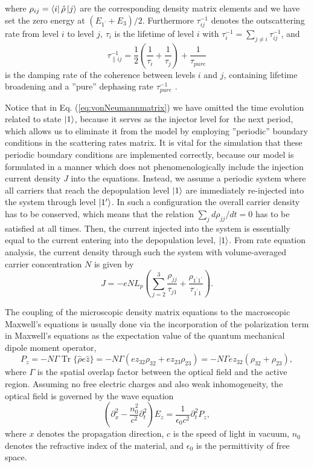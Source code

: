 \documentclass[10pt,letterpaper]{article}%
\DeclareMathOperator{\Tr}{Tr}
\begin{document}
where $\rho_{ij}=\Bra{i}\hat{\rho}\Ket{j}$ are the corresponding density
matrix elements and we have set the zero energy at $(E_{1^{\prime}}+E_{3})/2$.
Furthermore $\tau_{ij}^{-1}$ denotes the outscattering rate from level $i$ to
level $j$, $\tau_{i}$ is the lifetime of level $i$ with $\tau_{i}^{-1}%
=\sum_{j\neq i}\tau_{ij}^{-1}$, and
\[
\tau_{\parallel ij}^{-1}=\frac{1}{2}\left(  \frac{1}{\tau_{i}}+\frac{1}%
{\tau_{j}}\right)  +\frac{1}{\tau_{pure}}%
\]
is the damping rate of the coherence between levels $i$ and $j$, containing
lifetime broadening and a ''pure'' dephasing rate $\tau_{pure}^{-1}$
\cite{callebaut2005importance}.

Notice that in Eq. (\ref{eq:vonNeumannmatrix}) we have omitted the time
evolution related to state $\Ket{1}$, because it serves as the injector level
for\ the next period, which allows us to eliminate it from the model by
employing ''periodic'' boundary conditions in the scattering rates matrix. It
is vital for the simulation that these periodic boundary conditions are
implemented correctly, because our model is formulated in a manner which does
not phenomenologically include the injection current density $J$ into the
equations. Instead, we assume a periodic system where all carriers that reach
the depopulation level $\Ket{1}$ are immediately re-injected into the system
through level $\Ket{1'}$. In such a configuration the overall carrier density
has to be conserved, which means that the relation $\sum_{j}d\rho_{jj}/dt=0$
has to be satisfied at all times. Then, the current injected into the system
is essentially equal to the current entering into the depopulation level,
$\Ket{1}$. From rate equation analysis, the current density through such the
system with volume-averaged carrier concentration $N$ is given by
\cite{kumar2009coherence}\textrm{ }%
\begin{equation}
J=-eNL_{p}\left(  \sum_{j=2}^{3}\frac{\rho_{jj}}{\tau_{j1}}+\frac
{\rho_{1^{\prime}1^{\prime}}}{\tau_{1^{\prime}1}}\right)  .
\end{equation}

The coupling of the microscopic density matrix equations to the macroscopic
Maxwell's equations is usually done via the incorporation of the polarization
term in Maxwell's equations as the expectation value of the quantum mechanical
dipole moment operator,
\begin{equation}
P_{z}=-N\Gamma\Tr\{\hat{\rho}e\hat{z}\}=-N\Gamma(ez_{32}\rho_{32}+ez_{23}%
\rho_{23})=-N\Gamma ez_{32}(\rho_{32}+\rho_{23}), \label{eq:fullpolarization}%
\end{equation}
where $\Gamma$ is the spatial overlap factor between the optical field and the
active region. Assuming no free electric charges and also weak inhomogeneity,
the optical field is governed by the wave equation
\cite{boyd2003nonlinear,jirauschek2014modeling}
\begin{equation}
\left(  \partial_{x}^{2}-\frac{n_{0}^{2}}{c^{2}}\partial_{t}^{2}\right)
E_{z}=\frac{1}{\epsilon_{0}c^{2}}\partial_{t}^{2}P_{z}, \label{eq:fullwave}%
\end{equation}
where $x$ denotes the propagation direction, $c$ is the speed of light in
vacuum, $n_{0}$ denotes the refractive index of the material, and
$\epsilon_{0}$ is the permittivity of free space.
\end{document}
